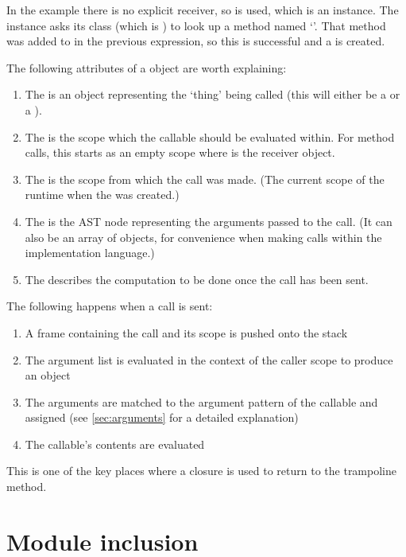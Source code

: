 In the example there is no explicit receiver, so  is used, which is an  instance. The instance asks its class (which is ) to look up a method named `'. That method was added to  in the previous expression, so this is successful and a  is created.

The following attributes of a  object are worth explaining:

\begin{enumerate}
  \item The  is an object representing the `thing' being called (this will either be a  or a ).
  \item The  is the scope which the callable should be evaluated within. For method calls, this starts as an empty scope where  is the receiver object.
  \item The  is the scope from which the call was made. (The current scope of the runtime when the  was created.)
  \item The  is the  AST node representing the arguments passed to the call. (It can also be an array of objects, for convenience when making calls within the implementation language.)
  \item The  describes the computation to be done once the call has been sent.
\end{enumerate}

The following happens when a call is sent:

\begin{enumerate}
  \item A frame containing the call and its scope is pushed onto the stack
  \item The argument list is evaluated in the context of the caller scope to produce an  object
  \item The arguments are matched to the argument pattern of the callable and assigned (see \autoref{sec:arguments} for a detailed explanation)
  \item The callable's contents are evaluated
\end{enumerate}

This is one of the key places where a closure is used to return to the trampoline method.

\section{Module inclusion}
\label{sec:module_inclusion}

